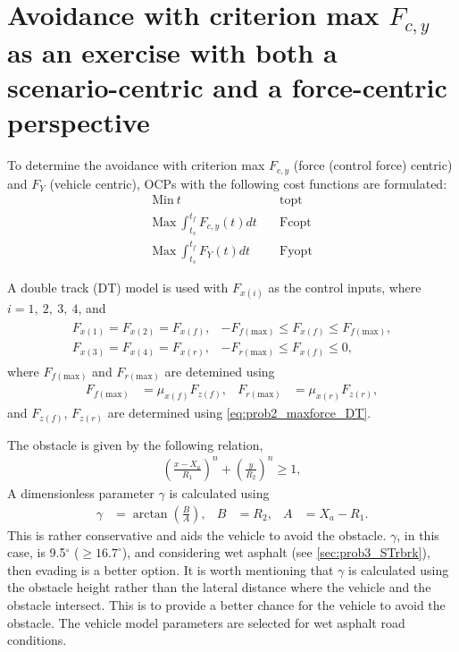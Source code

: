 \chapter[Force and scenario centric]{Avoidance with criterion max $F_{c,y}$ as an exercise with both a scenario-centric and a force-centric perspective}

To determine the avoidance with criterion max $F_{c,y}$ (force (control force) centric) and $F_{Y}$ (vehicle centric),  OCPs with the following cost functions are formulated:
\begin{align}
    \text{Min}\ t & \quad\text{topt}\\
    \text{Max}\ \int_{t_s}^{t_f} F_{c,y}(t) dt & \quad\text{Fcopt}\\
    \text{Max}\ \int_{t_s}^{t_f} F_{Y}(t) dt & \quad\text{Fyopt}
\end{align}

A double track (DT) model is used with $F_{x(i)}$ as the control inputs, where $i = 1,\ 2,\ 3,\ 4$, and 
\begin{align}
    \begin{array}{cl}
        F_{x(1)} = F_{x(2)} = F_{x(f)}, & -F_{f(\text{max})} \leq F_{x(f)} \leq F_{f(\text{max})}, \\
        F_{x(3)} = F_{x(4)} = F_{x(r)}, & -F_{r(\text{max})} \leq F_{x(f)} \leq 0,
    \end{array}
\end{align}
where $F_{f(\text{max})}$ and $F_{r(\text{max})}$ are detemined using 
\begin{align}
    F_{f(\text{max})} &= \mu_{x(f)}F_{z(f)}, & F_{r(\text{max})} &= \mu_{x(r)}F_{z(r)},
\end{align}
and $F_{z(f)}$, $F_{z(r)}$ are determined using \eqref{eq:prob2_maxforce_DT}.

The obstacle is given by the following relation, 
\begin{align}
    \left(\frac{x - X_a}{R_1}\right)^n + \left(\frac{y}{R_2}\right)^n \geq 1,
\end{align}
A dimensionless parameter $\gamma$ is calculated using 
\begin{align}
    \gamma &= \arctan\left(\frac{B}{A}\right), & B &= R_2, & A&= X_a - R_1.
\end{align}
This is rather conservative and aids the vehicle to avoid the obstacle. 
$\gamma$, in this case, is 9.5$^\circ$ ($\geq 16.7^\circ$), and considering wet asphalt (see \ref{sec:prob3_STrbrk}), then evading is a better option. 
It is worth mentioning that $\gamma$ is calculated using the obstacle height rather than the lateral distance where the vehicle and the obstacle intersect. 
This is to provide a better chance for the vehicle to avoid the obstacle. 
The vehicle model parameters are selected for wet asphalt road conditions.

